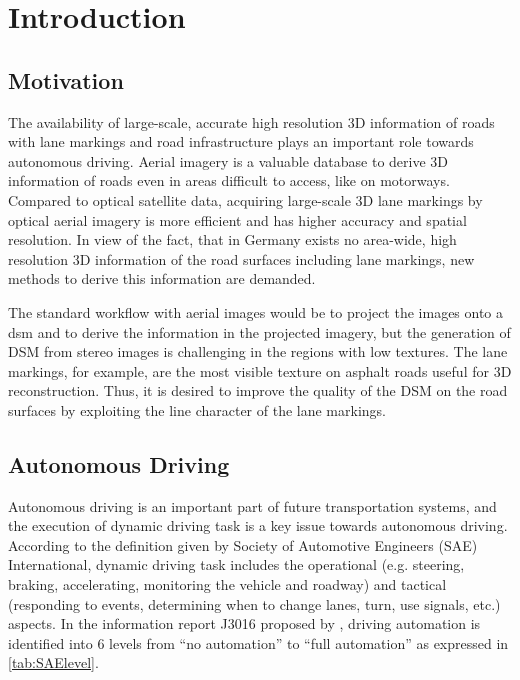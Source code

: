 
\chapter{Introduction}

\section{Motivation}
The availability of large-scale, accurate high resolution 3D information of roads with lane markings and road infrastructure plays an important role towards autonomous driving. Aerial imagery is a valuable database to derive 3D information of roads even in areas difficult to access, like on motorways. Compared to optical satellite data, acquiring large-scale 3D lane markings by optical aerial imagery is more efficient and has higher accuracy and spatial resolution. In view of the fact, that in Germany exists no area-wide, high resolution 3D information of the road surfaces including lane markings, new methods to derive this information are demanded.

The standard workflow with aerial images would be to project the images onto a \gls{dsm} and to derive the information in the projected imagery, but the generation of DSM from stereo images is challenging in the regions with low textures. The lane markings, for example, are the most visible texture on asphalt roads useful for 3D reconstruction. Thus, it is desired to improve the quality of the DSM on the road surfaces by exploiting the line character of the lane markings. 


\section{Autonomous Driving}

Autonomous driving is an important part of future transportation systems, and the execution of dynamic driving task is a key issue towards autonomous driving. According to the definition given by Society of Automotive Engineers (SAE) International, dynamic driving task includes the operational (e.g. steering, braking, accelerating, monitoring the vehicle and roadway) and tactical (responding to events, determining when to change lanes, turn, use signals, etc.) aspects. In the information report J3016 \cite{SAE2014} proposed by \citeauthor{SAE2014}, driving automation is identified into 6 levels from “no automation” to “full automation” as expressed in \cref{tab:SAElevel}. 


